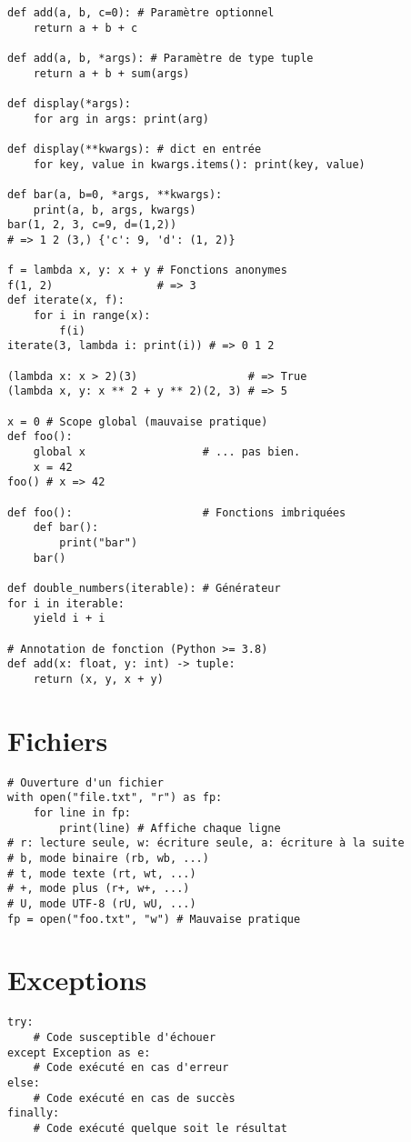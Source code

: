 \documentclass{article}
\begin{document}
\begin{multicols*}{4}
\begin{lstlisting}
def add(a, b, c=0): # Paramètre optionnel
    return a + b + c

def add(a, b, *args): # Paramètre de type tuple
    return a + b + sum(args)

def display(*args): 
    for arg in args: print(arg) 

def display(**kwargs): # dict en entrée
    for key, value in kwargs.items(): print(key, value)

def bar(a, b=0, *args, **kwargs):
    print(a, b, args, kwargs) 
bar(1, 2, 3, c=9, d=(1,2)) 
# => 1 2 (3,) {'c': 9, 'd': (1, 2)}

f = lambda x, y: x + y # Fonctions anonymes
f(1, 2)                # => 3
def iterate(x, f):
    for i in range(x):
        f(i)
iterate(3, lambda i: print(i)) # => 0 1 2

(lambda x: x > 2)(3)                 # => True
(lambda x, y: x ** 2 + y ** 2)(2, 3) # => 5

x = 0 # Scope global (mauvaise pratique)
def foo():
    global x                  # ... pas bien.
    x = 42
foo() # x => 42

def foo():                    # Fonctions imbriquées
    def bar():
        print("bar")
    bar()

def double_numbers(iterable): # Générateur
for i in iterable:
    yield i + i

# Annotation de fonction (Python >= 3.8)
def add(x: float, y: int) -> tuple:
    return (x, y, x + y)
\end{lstlisting}

\section*{Fichiers}
\begin{lstlisting}
# Ouverture d'un fichier
with open("file.txt", "r") as fp:
    for line in fp:
        print(line) # Affiche chaque ligne
# r: lecture seule, w: écriture seule, a: écriture à la suite
# b, mode binaire (rb, wb, ...)
# t, mode texte (rt, wt, ...)
# +, mode plus (r+, w+, ...)
# U, mode UTF-8 (rU, wU, ...)
fp = open("foo.txt", "w") # Mauvaise pratique
\end{lstlisting}

\section*{Exceptions}
\begin{lstlisting}
try: 
    # Code susceptible d'échouer
except Exception as e: 
    # Code exécuté en cas d'erreur
else: 
    # Code exécuté en cas de succès
finally: 
    # Code exécuté quelque soit le résultat
\end{lstlisting}


\end{multicols*}
\end{document}
